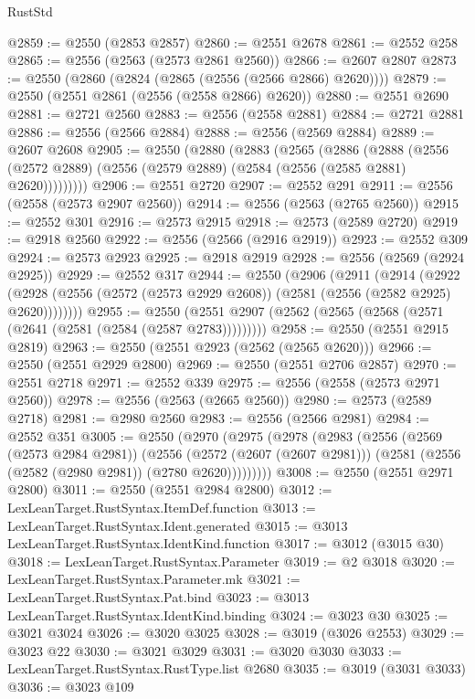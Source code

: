 \begin{lexlean}{RustStd}
\begin{coremodule}
@2859 := @2550 (@2853 @2857)
@2860 := @2551 @2678
@2861 := @2552 @258
@2865 := @2556 (@2563 (@2573 @2861 @2560))
@2866 := @2607 @2807
@2873 := @2550 (@2860 (@2824 (@2865 (@2556 (@2566 @2866) @2620))))
@2879 := @2550 (@2551 @2861 (@2556 (@2558 @2866) @2620))
@2880 := @2551 @2690
@2881 := @2721 @2560
@2883 := @2556 (@2558 @2881)
@2884 := @2721 @2881
@2886 := @2556 (@2566 @2884)
@2888 := @2556 (@2569 @2884)
@2889 := @2607 @2608
@2905 := @2550
    (@2880
      (@2883
        (@2565
          (@2886
            (@2888
              (@2556 (@2572 @2889) (@2556 (@2579 @2889) (@2584 (@2556 (@2585 @2881) @2620)))))))))
@2906 := @2551 @2720
@2907 := @2552 @291
@2911 := @2556 (@2558 (@2573 @2907 @2560))
@2914 := @2556 (@2563 (@2765 @2560))
@2915 := @2552 @301
@2916 := @2573 @2915
@2918 := @2573 (@2589 @2720)
@2919 := @2918 @2560
@2922 := @2556 (@2566 (@2916 @2919))
@2923 := @2552 @309
@2924 := @2573 @2923
@2925 := @2918 @2919
@2928 := @2556 (@2569 (@2924 @2925))
@2929 := @2552 @317
@2944 := @2550
    (@2906
      (@2911
        (@2914
          (@2922 (@2928 (@2556 (@2572 (@2573 @2929 @2608)) (@2581 (@2556 (@2582 @2925) @2620))))))))
@2955 := @2550 (@2551 @2907 (@2562 (@2565 (@2568 (@2571 (@2641 (@2581 (@2584 (@2587 @2783)))))))))
@2958 := @2550 (@2551 @2915 @2819)
@2963 := @2550 (@2551 @2923 (@2562 (@2565 @2620)))
@2966 := @2550 (@2551 @2929 @2800)
@2969 := @2550 (@2551 @2706 @2857)
@2970 := @2551 @2718
@2971 := @2552 @339
@2975 := @2556 (@2558 (@2573 @2971 @2560))
@2978 := @2556 (@2563 (@2665 @2560))
@2980 := @2573 (@2589 @2718)
@2981 := @2980 @2560
@2983 := @2556 (@2566 @2981)
@2984 := @2552 @351
@3005 := @2550
    (@2970
      (@2975
        (@2978
          (@2983
            (@2556
              (@2569 (@2573 @2984 @2981))
              (@2556
                (@2572 (@2607 (@2607 @2981)))
                (@2581 (@2556 (@2582 (@2980 @2981)) (@2780 @2620)))))))))
@3008 := @2550 (@2551 @2971 @2800)
@3011 := @2550 (@2551 @2984 @2800)
@3012 := LexLeanTarget.RustSyntax.ItemDef.function
@3013 := LexLeanTarget.RustSyntax.Ident.generated
@3015 := @3013 LexLeanTarget.RustSyntax.IdentKind.function
@3017 := @3012 (@3015 @30)
@3018 := LexLeanTarget.RustSyntax.Parameter
@3019 := @2 @3018
@3020 := LexLeanTarget.RustSyntax.Parameter.mk
@3021 := LexLeanTarget.RustSyntax.Pat.bind
@3023 := @3013 LexLeanTarget.RustSyntax.IdentKind.binding
@3024 := @3023 @30
@3025 := @3021 @3024
@3026 := @3020 @3025
@3028 := @3019 (@3026 @2553)
@3029 := @3023 @22
@3030 := @3021 @3029
@3031 := @3020 @3030
@3033 := LexLeanTarget.RustSyntax.RustType.list @2680
@3035 := @3019 (@3031 @3033)
@3036 := @3023 @109

\end{coremodule}
\end{lexlean}

